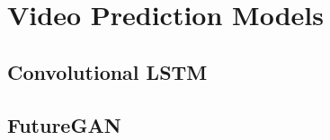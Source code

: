 \documentclass{scrartcl}
\begin{document}
%
%
%

\section{Video Prediction Models}
\label{sec:families}

\subsection{Convolutional LSTM}
\label{subsec:conv_lstm}

\subsection{FutureGAN}
\label{subsec:futuregan}
\end{document}
